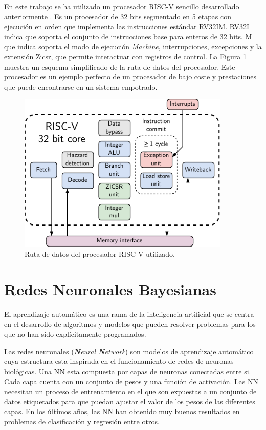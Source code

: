 En este trabajo se ha utilizado un procesador RISC-V sencillo desarrollado anteriormente \cite{riscv_tfg}. Es un procesador de 32 bits segmentado en 5 etapas con ejecución en orden que implementa las instrucciones estándar RV32IM. RV32I indica que soporta el conjunto de instrucciones base para enteros de 32 bits. M que indica soporta el modo de ejecución \textit{Machine}, interrupciones, excepciones y la extensión Zicsr, que permite interactuar con registros de control. La Figura \ref{fig:riscv_data_pipeline} muestra un esquema simplificado de la ruta de datos del procesador. Este procesador es un ejemplo perfecto de un procesador de bajo coste y prestaciones que puede encontrarse en un sistema empotrado.

\begin{figure}[h]
    \centering
    \includegraphics[width=0.9\textwidth]{root/Imagenes/3_estado_arte/riscv_core.pdf}
    \caption{Ruta de datos del procesador RISC-V utilizado.}
    \label{fig:riscv_data_pipeline}
\end{figure}

\section{Redes Neuronales Bayesianas}

El aprendizaje automático es una rama de la inteligencia artificial que se centra en el desarrollo de algoritmos y modelos que pueden resolver problemas para los que no han sido explícitamente programados.

Las redes neuronales (\textit{\textbf{N}eural \textbf{N}etwork}) son modelos de aprendizaje automático cuya estructura esta inspirada en el funcionamiento de redes de neuronas biológicas. Una NN esta compuesta por capas de neuronas conectadas entre si. Cada capa cuenta con un conjunto de pesos y una función de activación. Las NN necesitan un proceso de entrenamiento en el que son expuestas a un conjunto de datos etiquetados para que puedan ajustar el valor de los pesos de las diferentes capas. En los últimos años, las NN han obtenido muy buenos resultados en problemas de clasificación y regresión entre otros.

